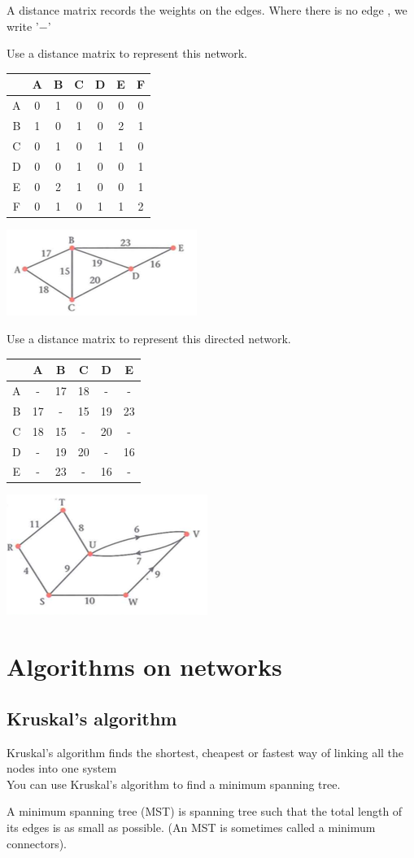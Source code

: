 \documentclass[a4paper]{article}
\begin{document}
\begin{defi}
A distance matrix records the weights on the edges. Where there is no edge , we write '$-$'
\end{defi}
\begin{eg}
Use a distance matrix to represent this network.\\
\begin{tabular}{c|cccccc}
   &A&B&C&D&E&F\\
 \hline
 A&0&1&0&0&0&0\\
 B&1&0&1&0&2&1\\
 C&0&1&0&1&1&0\\
 D&0&0&1&0&0&1\\
 E&0&2&1&0&0&1\\
 F&0&1&0&1&1&2\\
\end{tabular}
\includegraphics{img_D/2_2ex2}
\end{eg}
\begin{eg}
Use a distance matrix to represent this directed network.\\
\begin{tabular}{c|ccccc}
   &A&B&C&D&E\\
 \hline
 A&-&17&18&-&-\\
 B&17&-&15&19&23\\
 C&18&15&-&20&-\\
 D&-&19&20&-&16\\
 E&-&23&-&16&-\\
\end{tabular}
\includegraphics{img_D/2_2ex3}
\end{eg}
\section{Algorithms on networks}
\subsection{Kruskal's algorithm}
Kruskal's algorithm finds the shortest, cheapest or fastest way of linking all the nodes into one system\\
You can use Kruskal's algorithm to find a minimum spanning tree.
\begin{defi}
A minimum spanning tree (MST) is spanning tree such that the total length of its edges is as small as possible. (An MST is sometimes called a minimum connectors).
\end{defi}
\end{document}
